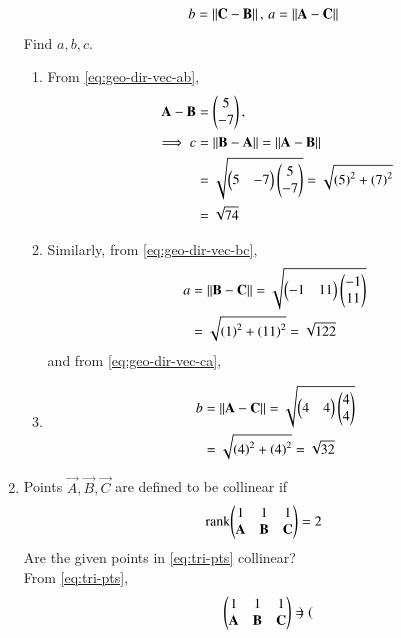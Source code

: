 \begin{enumerate}[label=\thesubsection.\arabic*.,ref=\thesubsection.\theenumi]
		\begin{align}
b = \left\lVert\mathbf{C}-\mathbf{B}\right\rVert,\,
a = \left\lVert\mathbf{A}-\mathbf{C}\right\rVert
		\end{align}
		Find $a, b, c$.
\begin{enumerate}
	\item 
	From 	
		\eqref{eq:geo-dir-vec-ab},
\begin{align}
\mathbf{A}-\mathbf{B} &= \begin{pmatrix}5\\-7\end{pmatrix}, \\
\implies 	c &= 	\left\lVert\mathbf{B}-\mathbf{A}\right\rVert = \left\lVert\mathbf{A}-\mathbf{B}\right\rVert 
	\\
	&= \sqrt{\begin{pmatrix}5 & -7\end{pmatrix}\begin{pmatrix}5\\-7\end{pmatrix}}
= \sqrt{\left(5\right)^2 +\left(7\right)^2}\\
	&=\sqrt{74}
		\label{eq:geo-norm-ab}
\end{align}
	\item Similarly, from 
		\eqref{eq:geo-dir-vec-bc},
\begin{align}
	a &= \left\lVert\mathbf{B}-\mathbf{C}\right\rVert 
	= \sqrt{\begin{pmatrix}-1 & 11\end{pmatrix}\begin{pmatrix}-1\\11\end{pmatrix}}
\\
&= \sqrt{\left(1\right)^2+\left(11\right)^2}
	= \sqrt{122}
		\label{eq:geo-norm-bc}
\end{align}
and
		from 		\eqref{eq:geo-dir-vec-ca},
	\item 
		\begin{align}
			b &= \left\lVert\mathbf{A}-\mathbf{C}\right\rVert = \sqrt{\begin{pmatrix}4 & 4\end{pmatrix}\begin{pmatrix}4\\4\end{pmatrix}}
\\
&= \sqrt{\left(4\right)^2+\left(4\right)^2}
	=\sqrt{32}
		\label{eq:geo-norm-ca}
\end{align}
\end{enumerate}
\item   Points $\vec{A}, \vec{B}, \vec{C}$ are defined to be collinear if 
		\begin{align}
			\label{eq:line-rank}
			\text{rank}{\ensuremath{\begin{pmatrix}1 & 1 & 1 \\ \mathbf{A}& \mathbf{B}&\mathbf{C}\end{pmatrix}}} = 2
		\end{align}
Are the given points in
			\eqref{eq:tri-pts}
collinear?
\\
\solution 
From 
			\eqref{eq:tri-pts},
\begin{align}
    \label{eq:1.1.3,2}
\begin{pmatrix}
    1 & 1 & 1\\
    \mathbf{A} & \mathbf{B} & \mathbf{C} \\
    \end{pmatrix} 
    =
    \begin{pmatrix}
\end{pmatrix}
\end{align}
\end{enumerate}

